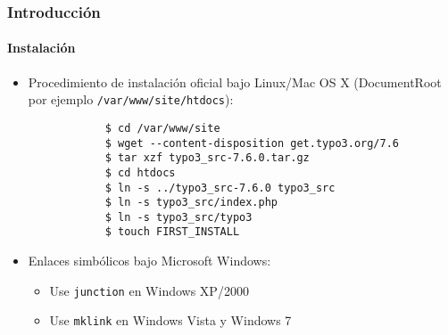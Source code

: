 \begin{frame}[fragile]
	\frametitle{Introducción}
	\framesubtitle{Instalación}

	\begin{itemize}
		\item Procedimiento de instalación oficial bajo Linux/Mac OS X\newline
			(DocumentRoot por ejemplo \texttt{/var/www/site/htdocs}):
		\begin{lstlisting}
			$ cd /var/www/site
			$ wget --content-disposition get.typo3.org/7.6
			$ tar xzf typo3_src-7.6.0.tar.gz
			$ cd htdocs
			$ ln -s ../typo3_src-7.6.0 typo3_src
			$ ln -s typo3_src/index.php
			$ ln -s typo3_src/typo3
			$ touch FIRST_INSTALL
		\end{lstlisting}

		\item Enlaces simbólicos bajo Microsoft Windows:

			\begin{itemize}
				\item Use \texttt{junction} en Windows XP/2000
				\item Use \texttt{mklink} en Windows Vista y Windows 7
			\end{itemize}

	\end{itemize}
\end{frame}

